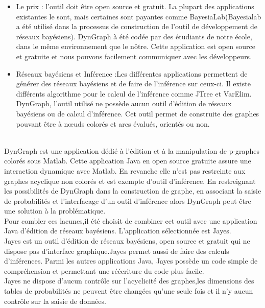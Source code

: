 \documentclass[conference]{IEEEtran}
\begin{document}
\begin{itemize}
	\item{Le prix :} l'outil doit être open source et gratuit. La plupart des applications  existantes le sont, mais certaines sont payantes comme BayesiaLab(Bayesialab a été utilisé dans la processus de construction de l'outil de développement de réseaux bayésiens). DynGraph à été codée par des étudiants de notre école, dans le même environnement que le nôtre. Cette application est open source et gratuite et nous pouvons facilement communiquer avec les développeurs. \\
	
	\item{Réseaux bayésiens et Inférence :}Les différentes applications permettent de générer des réseaux bayésiens et de faire de l'inférence sur ceux-ci. Il existe différents algorithme pour le calcul de l'inférence comme JTree et VarElim. DynGraph, l'outil utilisé ne possède aucun outil d'édition de réseaux bayésiens ou de calcul d'inférence. Cet outil permet de construite des graphes pouvant être à nœuds colorés et arcs évalués, orientés ou non. \\
	
\end{itemize}
\\

DynGraph est une application dédié à l'édition et à la manipulation de p-graphes colorés sous Matlab. Cette application Java en open source gratuite assure une interaction dynamique avec Matlab. En revanche elle n'est pas restreinte aux graphes acyclique non colorés et est exempte d'outil d'inférence. 
En restreignant les possibilités de DynGraph dans la construction de graphe, en associant la saisie de probabilités et l'interfacage d'un outil d'inférence alors DynGraph peut être une solution à la problématique. \\
Pour combler ces lacunes,il été choisit de combiner cet outil avec une application Java d'édition de réseaux bayésiens. L'application sélectionnée est Jayes.\\
Jayes est un outil d'édition de réseaux bayésiens, open source et gratuit qui ne dispose pas d'interface graphique.Jayes permet aussi de faire des calculs d'inférences. Parmi les autres applications Java, Jayes possède un code simple de compréhension et permettant une réécriture du code plus facile. \\
Jayes ne dispose d'aucun contrôle sur l'acyclicité des graphes,les dimensions des tables de probabilités ne peuvent être changées qu'une seule fois et il n'y aucun contrôle sur la saisie de données.\\ 
\end{document}

